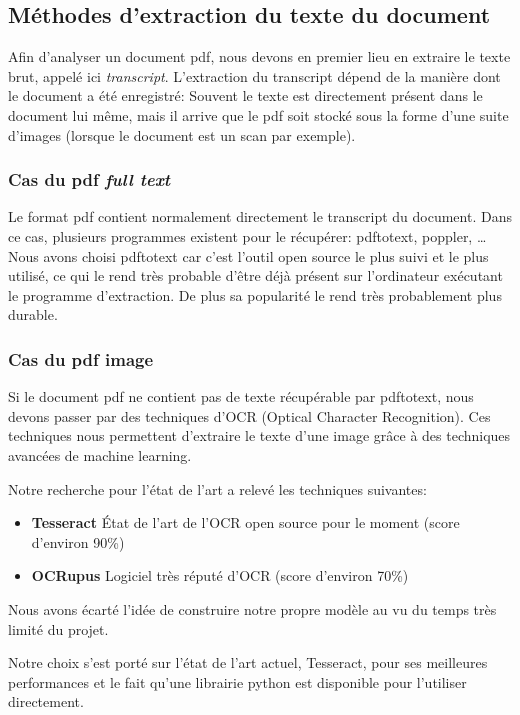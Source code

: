 

\subsection{Méthodes d'extraction du texte du document}
Afin d'analyser un document pdf, nous devons en premier lieu en extraire le texte brut, appelé ici \textit{transcript}.
L'extraction du transcript dépend de la manière dont le document a été enregistré: Souvent le texte est directement présent dans le document lui même, mais il arrive que le pdf soit stocké sous la forme d'une suite d'images (lorsque le document est un scan par exemple).

\subsubsection{Cas du pdf \textit{full text}}
Le format pdf contient normalement directement le transcript du document.
Dans ce cas, plusieurs programmes existent pour le récupérer: pdftotext, poppler, \ldots 
Nous avons choisi pdftotext car c'est l'outil open source le plus suivi et le plus utilisé, ce qui le rend très probable d'être déjà présent sur l'ordinateur exécutant le programme d'extraction.
De plus sa popularité le rend très probablement plus durable.

\subsubsection{Cas du pdf image}
Si le document pdf ne contient pas de texte récupérable par pdftotext, nous devons passer par des techniques d'OCR (Optical Character Recognition).
Ces techniques nous permettent d'extraire le texte d'une image grâce à des techniques avancées de machine learning.

Notre recherche pour l'état de l'art a relevé les techniques suivantes:
\begin{itemize}
\item \textbf{Tesseract}
État de l'art de l'OCR open source pour le moment (score d'environ 90\%)
\item \textbf{OCRupus}
Logiciel très réputé d'OCR (score d'environ 70\%)
\end{itemize}
Nous avons écarté l'idée de construire notre propre modèle au vu du temps très limité du projet.

Notre choix s'est porté sur l'état de l'art actuel, Tesseract, pour ses meilleures performances et le fait qu'une librairie python est disponible pour l'utiliser directement.

